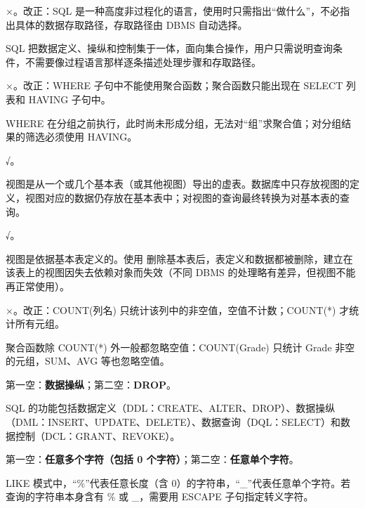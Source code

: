 \documentclass[a4paper,11pt]{article}
\begin{document}

\q ×。改正：SQL 是一种高度非过程化的语言，使用时只需指出“做什么”，不必指出具体的数据存取路径，存取路径由 DBMS 自动选择。\begin{analysis}SQL 把数据定义、操纵和控制集于一体，面向集合操作，用户只需说明查询条件，不需要像过程语言那样逐条描述处理步骤和存取路径。\end{analysis}

\q ×。改正：WHERE 子句中不能使用聚合函数；聚合函数只能出现在 SELECT 列表和 HAVING 子句中。\begin{analysis}WHERE 在分组之前执行，此时尚未形成分组，无法对“组”求聚合值；对分组结果的筛选必须使用 HAVING。\end{analysis}

\q √。\begin{analysis}视图是从一个或几个基本表（或其他视图）导出的虚表。数据库中只存放视图的定义，视图对应的数据仍存放在基本表中；对视图的查询最终转换为对基本表的查询。\end{analysis}

\q √。\begin{analysis}视图是依据基本表定义的。使用  删除基本表后，表定义和数据都被删除，建立在该表上的视图因失去依赖对象而失效（不同 DBMS 的处理略有差异，但视图不能再正常使用）。\end{analysis}

\q ×。改正：COUNT(列名) 只统计该列中的非空值，空值不计数；COUNT(*) 才统计所有元组。\begin{analysis}聚合函数除 COUNT(*) 外一般都忽略空值：COUNT(Grade) 只统计 Grade 非空的元组，SUM、AVG 等也忽略空值。\end{analysis}


\q 第一空：\textbf{数据操纵}；第二空：\textbf{DROP}。\begin{analysis}SQL 的功能包括数据定义（DDL：CREATE、ALTER、DROP）、数据操纵（DML：INSERT、UPDATE、DELETE）、数据查询（DQL：SELECT）和数据控制（DCL：GRANT、REVOKE）。\end{analysis}

\q 第一空：\textbf{任意多个字符（包括 0 个字符）}；第二空：\textbf{任意单个字符}。\begin{analysis}LIKE 模式中，“\%”代表任意长度（含 0）的字符串，“\_”代表任意单个字符。若查询的字符串本身含有 \% 或 \_，需要用 ESCAPE 子句指定转义字符。\end{analysis}
\end{document}
